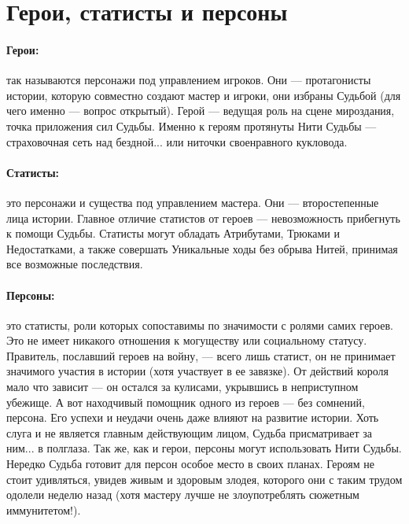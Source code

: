 \section{Герои, статисты и персоны}
\paragraph{Герои:} так называются персонажи под управлением игроков. Они — протагонисты истории, которую совместно создают мастер и игроки, они избраны Судьбой (для чего именно — вопрос открытый). Герой — ведущая роль на сцене мироздания, точка приложения сил Судьбы. Именно к героям протянуты Нити Судьбы — страховочная сеть над бездной... или ниточки своенравного кукловода.
\paragraph{Статисты:} это персонажи и существа под управлением мастера. Они — второстепенные лица истории. Главное отличие статистов от героев — невозможность прибегнуть к помощи Судьбы. Статисты могут обладать Атрибутами, Трюками и Недостатками, а также совершать Уникальные ходы без обрыва Нитей, принимая все возможные последствия.
\paragraph{Персоны:} это статисты, роли которых сопоставимы по значимости с ролями самих героев. Это не имеет никакого отношения к могуществу или социальному статусу. Правитель, пославший героев на войну, — всего лишь статист, он не принимает значимого участия в истории (хотя участвует в ее завязке). От действий короля мало что зависит — он остался за кулисами, укрывшись в неприступном убежище. А вот находчивый помощник одного из героев — без сомнений, персона. Его успехи и неудачи очень даже влияют на развитие истории. Хоть слуга и не является главным действующим лицом, Судьба присматривает за ним... в полглаза. Так же, как и герои, персоны могут использовать Нити Судьбы. 
\newline Нередко Судьба готовит для персон особое место в своих планах. Героям не стоит удивляться, увидев живым и здоровым злодея, которого они с таким трудом одолели неделю назад (хотя мастеру лучше не злоупотреблять сюжетным иммунитетом!).


